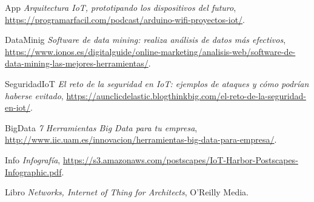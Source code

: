 \documentclass{article}
\begin{document}
\begin{thebibliography}{9}
\item{App} \textit{Arquitectura IoT, prototipando los dispositivos del futuro}, \url{https://programarfacil.com/podcast/arduino-wifi-proyectos-iot/}.
\item{DataMinig} \textit{Software de data mining: realiza análisis de datos más efectivos}, \url{https://www.ionos.es/digitalguide/online-marketing/analisis-web/software-de-data-mining-las-mejores-herramientas/}.
\item{SeguridadIoT} \textit{El reto de la seguridad en IoT: ejemplos de ataques y cómo podrían haberse evitado}, \url{https://aunclicdelastic.blogthinkbig.com/el-reto-de-la-seguridad-en-iot/}.
\item{BigData} \textit{7 Herramientas Big Data para tu empresa}, \url{http://www.iic.uam.es/innovacion/herramientas-big-data-para-empresa/}.
\item{Info} \textit{Infografía}, \url{https://s3.amazonaws.com/postscapes/IoT-Harbor-Postscapes-Infographic.pdf}.
\item{Libro} \textit{Networks, Internet of Thing for Architects}, O'Reilly Media.
\end{thebibliography}
\end{document}
